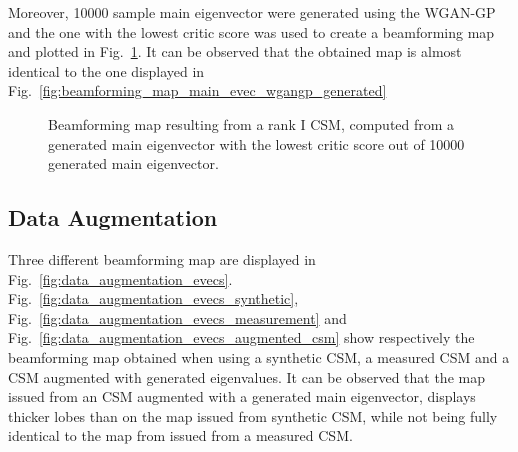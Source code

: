 \documentclass[11pt,a4paper,twoside]{report}
\begin{document}
Moreover, 10000 sample main eigenvector were generated using the WGAN-GP and the one with the lowest critic score was used to create a beamforming map and plotted in Fig.~\ref{fig:outliers_main_evec}. It can be observed that the obtained map is almost identical to the one displayed in Fig.~\ref{fig:beamforming_map_main_evec_wgangp_generated}  

\begin{figure}
    \centering
    \caption{Beamforming map resulting from a rank I CSM, computed from a generated main eigenvector with the lowest critic score out of 10000 generated main eigenvector.}
    \label{fig:outliers_main_evec}    
\end{figure}

\subsection{Data Augmentation}

Three different beamforming map are displayed in Fig.~\ref{fig:data_augmentation_evecs}. Fig.~\ref{fig:data_augmentation_evecs_synthetic}, Fig.~\ref{fig:data_augmentation_evecs_measurement} and Fig.~\ref{fig:data_augmentation_evecs_augmented_csm} show respectively the beamforming map obtained when using a synthetic CSM, a measured CSM and a CSM augmented with generated eigenvalues. It can be observed that the map issued from an CSM augmented with a generated main eigenvector, displays thicker lobes than on the map issued from synthetic CSM, while not being fully identical to the map from issued from a measured CSM.
\end{document}
